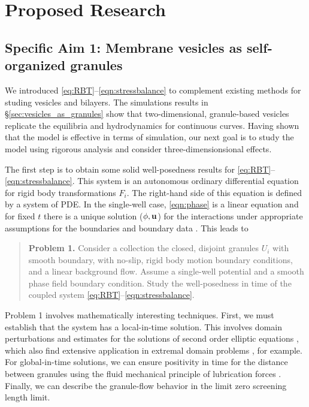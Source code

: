 \section{Proposed Research}
\label{sec:proposed-work}

\subsection{Specific Aim 1: Membrane vesicles as self-organized granules}
\label{sec:specificaim1}
We introduced \eqref{eq:RBT}--\eqref{eqn:stressbalance} to complement
existing methods for studing vesicles and bilayers. 
The simulations results in \S \ref{sec:vesicles_as_granules}
show that two-dimensional, granule-based vesicles replicate the 
equilibria and hydrodynamics for continuous curves.
Having shown that the model is effective in terms of simulation,
our next goal is to study the model using rigorous analysis
and consider three-dimensionsional effects. 

The first step is to obtain some solid well-posedness results
for \eqref{eq:RBT}--\eqref{eqn:stressbalance}.
This system is an autonomous ordinary differential equation for
rigid body transformations $F_i$.  The right-hand side of this
equation is defined by a system of PDE.  In the single-well case,
\eqref{eqn:phase} is a linear equation
and for fixed $t$ there is a unique solution
($\phi, \mathbf{u}$) for the interactions under appropriate
assumptions for the boundaries and boundary data
\cite{manasthesis,rac-gre2016,LAX}.
This leads to 
\begin{quotation}
  \textbf{Problem 1.} 
  Consider a collection the closed, disjoint granules
  $U_i$ with smooth boundary, with no-slip, rigid body
  motion boundary conditions, and a linear background flow.
  Assume a single-well potential and a smooth phase field
  boundary condition.  Study the well-posedness in
  time of the coupled system \eqref{eq:RBT}--\eqref{eqn:stressbalance}.
\end{quotation}
Problem 1 involves mathematically interesting techniques.
First, we must establish that the system has a local-in-time solution.
This involves domain perturbations and estimates for the
solutions of second order elliptic equations
\cite{Savar2002DomainPA, DANERS20081, Lamboley2015EstimatesOF},
which also find extensive application in extremal domain problems
\cite{Schiffer1954VariationOD, Henrot2006ExtremumPF,
  bogosel:hal-03607776,Bogosel2022OnTP}, for example.
For global-in-time solutions,
we can ensure positivity in time for the distance between granules
using the fluid mechanical principle of
lubrication forces \cite{cawthorn_balmforth_2010, leal_2007}.
Finally, we can describe the granule-flow
behavior in the limit zero screening length limit.

